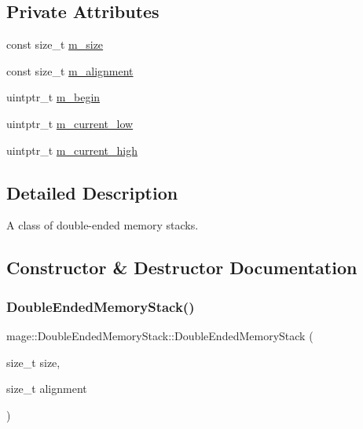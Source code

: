 \subsection*{Private Attributes}
\begin{DoxyCompactItemize}
\item 
const size\+\_\+t \hyperlink{classmage_1_1_double_ended_memory_stack_a3a3ff5dbdcca2fcd2939e8e92528abcc}{m\+\_\+size}
\item 
const size\+\_\+t \hyperlink{classmage_1_1_double_ended_memory_stack_ab30dfcd0b66ec97a62e62fb6b573751e}{m\+\_\+alignment}
\item 
uintptr\+\_\+t \hyperlink{classmage_1_1_double_ended_memory_stack_aee3d3cf829712607a9859e72abd5ab7f}{m\+\_\+begin}
\item 
uintptr\+\_\+t \hyperlink{classmage_1_1_double_ended_memory_stack_a8a97b154eaab706e7d293ef00404269d}{m\+\_\+current\+\_\+low}
\item 
uintptr\+\_\+t \hyperlink{classmage_1_1_double_ended_memory_stack_a22cfadce68da8cdcc480ccd44707b5cf}{m\+\_\+current\+\_\+high}
\end{DoxyCompactItemize}


\subsection{Detailed Description}
A class of double-\/ended memory stacks. 

\subsection{Constructor \& Destructor Documentation}
\hypertarget{classmage_1_1_double_ended_memory_stack_a6480666c03ac703fc4fd5a62a766438d}{}\label{classmage_1_1_double_ended_memory_stack_a6480666c03ac703fc4fd5a62a766438d} 
\subsubsection{\texorpdfstring{Double\+Ended\+Memory\+Stack()}{DoubleEndedMemoryStack()}\hspace{0.1cm}{\footnotesize\ttfamily [1/3]}}
{\footnotesize\ttfamily mage\+::\+Double\+Ended\+Memory\+Stack\+::\+Double\+Ended\+Memory\+Stack (\begin{DoxyParamCaption}\item[{size\+\_\+t}]{size,  }\item[{size\+\_\+t}]{alignment }\end{DoxyParamCaption})\hspace{0.3cm}{\ttfamily [explicit]}}

